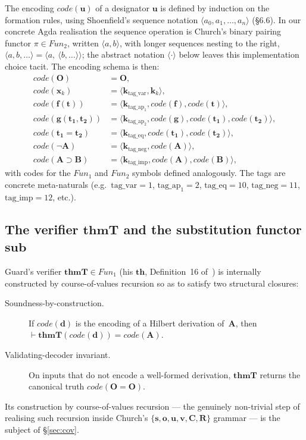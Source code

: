 \documentclass[11pt]{article}
\theoremstyle{plain}
\theoremstyle{definition}
\theoremstyle{remark}
\newcommand{\code}[1]{\mathit{code}(#1)}
\newcommand{\sub}{\mathbf{sub}}
\newcommand{\thmT}{\mathbf{thmT}}
\newcommand{\seq}[1]{\langle #1 \rangle}
\newcommand{\Fun}{\mathit{Fun}}
\begin{document}
The encoding $\code{\mathbf{u}}$ of a designator $\mathbf{u}$ is
defined by induction on the formation rules, using Shoenfield's
sequence notation $\seq{a_0, a_1, \ldots, a_n}$ ({\S}6.6).  In our
concrete Agda realisation the sequence operation is Church's binary
pairing functor $\pi \in \Fun_2$, written $\seq{a, b}$, with longer
sequences nesting to the right, $\seq{a, b, \ldots} = \seq{a,\ \seq{b, \ldots}}$;
the abstract notation $\seq{\cdot}$ below leaves this implementation
choice tacit.  The encoding schema is then:
\begin{align*}
\code{\mathbf{O}}              &= \mathbf{O}, \\
\code{\mathbf{x}_k}            &= \seq{\mathbf{k}_{\mathrm{tag\_var}}, \mathbf{k}_k}, \\
\code{\mathbf{f}(\mathbf{t})}  &= \seq{\mathbf{k}_{\mathrm{tag\_ap_1}}, \code{\mathbf{f}}, \code{\mathbf{t}}}, \\
\code{\mathbf{g}(\mathbf{t_1}, \mathbf{t_2})} &= \seq{\mathbf{k}_{\mathrm{tag\_ap_2}}, \code{\mathbf{g}}, \code{\mathbf{t_1}}, \code{\mathbf{t_2}}}, \\
\code{\mathbf{t_1} = \mathbf{t_2}} &= \seq{\mathbf{k}_{\mathrm{tag\_eq}}, \code{\mathbf{t_1}}, \code{\mathbf{t_2}}}, \\
\code{\neg \mathbf{A}}         &= \seq{\mathbf{k}_{\mathrm{tag\_neg}}, \code{\mathbf{A}}}, \\
\code{\mathbf{A} \supset \mathbf{B}} &= \seq{\mathbf{k}_{\mathrm{tag\_imp}}, \code{\mathbf{A}}, \code{\mathbf{B}}},
\end{align*}
with codes for the $\Fun_1$ and $\Fun_2$ symbols defined analogously.
The tags are concrete meta-naturals (e.g.\ $\mathrm{tag\_var}=1$,
$\mathrm{tag\_ap_1}=2$, $\mathrm{tag\_eq}=10$, $\mathrm{tag\_neg}=11$,
$\mathrm{tag\_imp}=12$, etc.).

\subsection{The verifier $\thmT$ and the substitution functor $\sub$}

Guard's verifier $\thmT \in \Fun_1$ (his $\mathbf{th}$, Definition~16
of~\cite{Guard63}) is internally constructed by course-of-values
recursion so as to satisfy two structural closures:
\begin{description}
\item[Soundness-by-construction.] If $\code{\mathbf{d}}$ is the
encoding of a Hilbert derivation of~$\mathbf{A}$, then
$\vdash \thmT(\code{\mathbf{d}}) = \code{\mathbf{A}}$.

\item[Validating-decoder invariant.] On inputs that do not
encode a well-formed derivation, $\thmT$ returns the canonical truth
$\code{\mathbf{O} = \mathbf{O}}$.
\end{description}
Its construction by course-of-values recursion --- the genuinely
non-trivial step of realising such recursion inside Church's
$\{\mathbf{s},\mathbf{o},\mathbf{u},\mathbf{v},\mathbf{C},\mathbf{R}\}$
grammar --- is the subject of {\S}\ref{sec:cov}.
\end{document}
